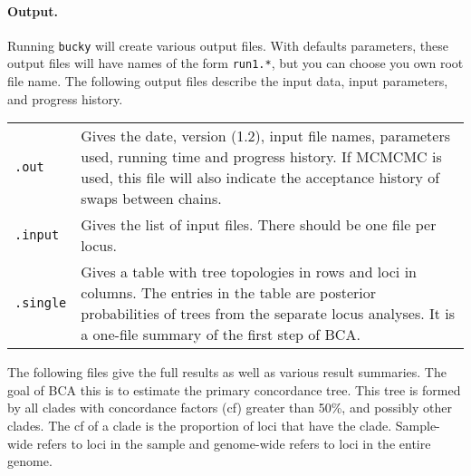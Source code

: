 \documentclass[12pt,english,final,letterpaper]{article}
\begin{document}
\paragraph{Output.}
Running {\tt bucky} will create various output files. With defaults 
parameters, these output files will have names of the form {\tt run1.*}, 
but you can choose you own root file name.
The following output files describe the input data, input parameters, and
progress history.
\bigskip

\noindent
\begin{tabular}{l|p{5.7in}}
{\tt .out}& Gives the date, version (1.2), input file names, 
parameters used, running time and progress history. If MCMCMC is used, 
this file will also indicate the acceptance history of swaps between chains.\\
{\tt .input}& Gives the list of input files. There should be one file 
per locus.\\
{\tt .single}& Gives a table with tree topologies in rows and loci in 
columns. The entries in the table are posterior probabilities of trees from the
separate locus analyses. It is a one-file summary of the first step of BCA.\\
\end{tabular}

\bigskip\bigskip
\bigskip

The following files give the full results as well as various result summaries.
The goal of BCA this is to estimate the primary
concordance tree. This tree is formed by all clades with concordance 
factors ({\sc cf}) greater than 50\%, and possibly other clades. 
The {\sc cf} of a clade is the proportion of loci that have 
the clade. Sample-wide refers to loci in the sample and genome-wide 
refers to loci in the entire genome.

\bigskip
\end{document}
